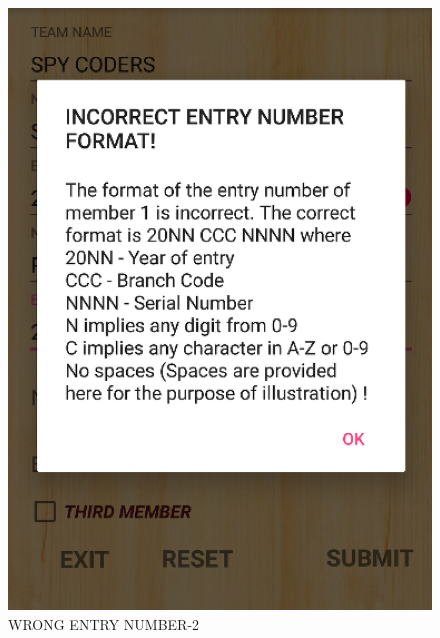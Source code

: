 \documentclass[12pt]{article}
\begin{document}
\begin{itemize}
\begin{itemize}
\begin{figure}
	\centering
	\includegraphics[scale=.7]{INCORRECT_NUMBER_FORMAT}
	\caption{WRONG ENTRY NUMBER-2}
\end{figure}
\begin{figure}
	\centering

\end{figure}
\end{itemize}
\end{itemize}
\end{document}

